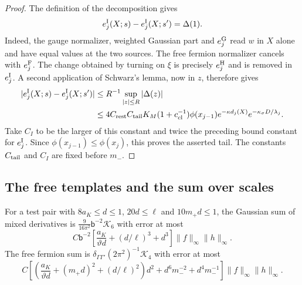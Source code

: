 \documentclass[11pt,letterpaper,reqno]{amsart}
\makeatletter
\theoremstyle{definition}
\newcommand{\ms@minorstart}{%
  \pushQED{\qed}\renewcommand{\qedsymbol}{$\blacksquare$}}
\newenvironment{lemma}[1][]{\ms@minorstart\ms@lemma[#1]}
  {\popQED\endms@lemma}
\theoremstyle{remark}
\makeatother
\begin{document}
\begin{proof}
The definition of the decomposition gives
\[
 e_j^{\rm I}(X;s)-e_j^{\rm I}(X;s')=\Delta(1).
\]
Indeed, the gauge normalizer, weighted Gaussian
part and $e_j^{\rm G}$ read $w$ in $X$ alone
and have equal values at the two sources.
The free fermion normalizer cancels with
$e_j^{\rm F}$. The change obtained by turning
on $\xi$ is precisely $e_j^{\rm H}$ and is
removed in $e_j^{\rm I}$. A second application
of Schwarz's lemma, now in $z$, therefore gives
\[
\begin{split}
 |e_j^{\rm I}(X;s)-e_j^{\rm I}(X;s')|
 &\le R^{-1}\sup_{|z|\le R}|\Delta(z)|\\
 &\le4C_{\rm rest}C_{\rm tail}K_M(1+c_{\rm cl}^{-1})
       \phi(x_{j-1})e^{-\kappa d_j(X)}
                         e^{-\kappa_\sigma D/\lambda_j}.
\end{split}
\]
Take $C_I$ to be the larger of this constant
and twice the preceding bound constant for
$e_j^{\rm I}$. Since $\phi(x_{j-1})\le\phi(x_j)$,
this proves the asserted tail. The constants
$C_{\rm tail}$ and $C_I$ are fixed before $m_-$.
\end{proof}

\subsection{The free templates and the sum over scales}

\begin{lemma}[The templates]\label{C-408-25}
For a test pair with $8a_K\le d\le1$, $20d\le\ell$ and
$10m_+d\le1$,
the Gaussian sum of mixed derivatives is
$\frac9{16\pi^2}\mathsf b^{-2}\mathcal K_6$ with error at most
\[
 C\mathsf b^{-2}\left[\frac{a_K}{\vartheta d}
                   +(d/\ell)^3+d^3\right]\|f\|_\infty\|h\|_\infty.
\]
The free fermion sum is
$\delta_{\Gamma\Gamma'}(2\pi^2)^{-1}\mathcal K_4$ with error at most
\[
 C\left[\left(\frac{a_K}{\vartheta d}+(m_+d)^2
                       +(d/\ell)^2\right)d^2
       +d^6m_-^{-2}+d^4m_-^{-1}\right]
                          \|f\|_\infty\|h\|_\infty.
\]
\end{lemma}
\end{document}
